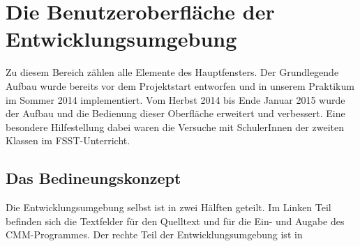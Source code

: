 \section{Die Benutzeroberfläche der Entwicklungsumgebung}
Zu diesem Bereich zählen alle Elemente des Hauptfensters. Der Grundlegende Aufbau wurde bereits vor dem Projektstart entworfen und in unserem Praktikum im Sommer 2014 implementiert. Vom Herbst 2014 bis Ende Januar 2015 wurde der Aufbau und die Bedienung dieser Oberfläche erweitert und verbessert. Eine besondere Hilfestellung dabei waren die Versuche mit SchulerInnen der zweiten Klassen im FSST-Unterricht.

\subsection{Das Bedineungskonzept}
Die Entwicklungsumgebung selbst ist in zwei Hälften geteilt. Im Linken Teil befinden sich die Textfelder für den Quelltext und für die Ein- und Augabe des CMM-Programmes. Der rechte Teil der Entwicklungsumgebung ist in 